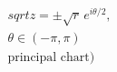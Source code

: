 \documentclass[preview]{standalone}
\begin{document}
\begin{align*}
\quad\\sqrt{z} = \pm \sqrt{r}\,e^{i\theta/2},\quad\\\theta\in(-\pi,\pi)\quad\\ \text{principal chart)}
\end{align*}
\end{document}
